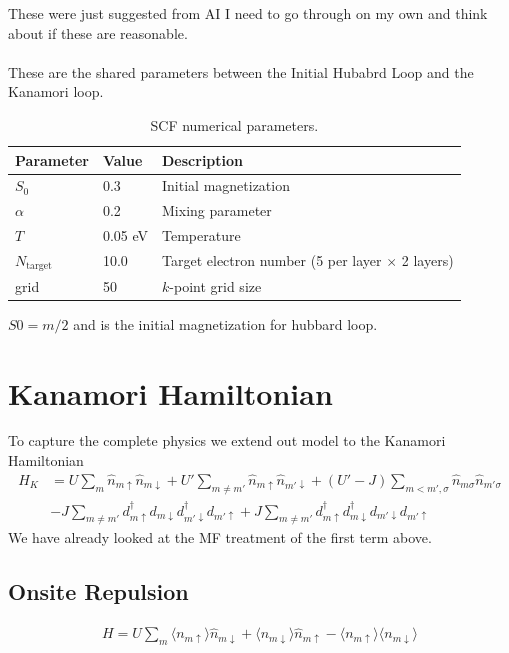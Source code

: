 \documentclass[11pt]{article}
\begin{document}
These were just suggested from AI I need to go through on my own and think about
if these are reasonable.
\\\\
These are the shared parameters between the Initial Hubabrd Loop and the Kanamori loop.
\begin{table}[h]
\centering
\begin{tabular}{lll}
\hline
Parameter & Value & Description \\
\hline
$S_0$       & 0.3  & Initial magnetization \\
$\alpha$    & 0.2  & Mixing parameter \\
$T$         & 0.05 eV & Temperature \\
$N_{\text{target}}$ & 10.0 & Target electron number (5 per layer $\times$ 2 layers) \\
grid        & 50   & $k$-point grid size \\
\hline
\end{tabular}
\caption{SCF numerical parameters.}
\label{tab:scf_params}
\end{table}

$S0 = m/2$ and is the initial magnetization for hubbard loop.

\section{Kanamori Hamiltonian}
To capture the complete physics we extend out model to the Kanamori Hamiltonian
\begin{align}
    H_K &= U\sum_m \hat n_{m \uparrow} \hat n_{m \downarrow} 
    + U' \sum_{m \neq m'} \hat n_{m \uparrow}  \hat n_{m' \downarrow} 
    + (U'-J) \sum_{m < m', \sigma} \hat n_{m\sigma} \hat n_{m' \sigma} \\\nonumber
    &- J \sum_{m \neq m'} d^\dagger_{m\uparrow} d_{m \downarrow}d^\dagger_{m' \downarrow}d_{m'\uparrow}
    + J \sum_{m \neq m'} d^\dagger_{m\uparrow} d^\dagger_{m \downarrow} d_{m' \downarrow} d_{m' \uparrow}
\end{align}
We have already looked at the MF treatment of the first term above.

\subsection{Onsite Repulsion}
\begin{gather}
        H = U \sum_m \langle n_{m\uparrow}\rangle \hat n_{m\downarrow} + \langle n_{m\downarrow}\rangle \hat n_{m\uparrow} - \langle n_{m\uparrow}\rangle \langle n_{m\downarrow}\rangle
\end{gather}
\end{document}
